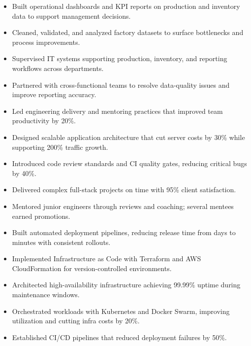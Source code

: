
\begin{itemize}
\item Built operational dashboards and KPI reports on production and inventory data to support management decisions.
\item Cleaned, validated, and analyzed factory datasets to surface bottlenecks and process improvements.
\item Supervised IT systems supporting production, inventory, and reporting workflows across departments.
\item Partnered with cross-functional teams to resolve data-quality issues and improve reporting accuracy.
\end{itemize}
\divider

\begin{itemize}
\item Led engineering delivery and mentoring practices that improved team productivity by 20\%.
\item Designed scalable application architecture that cut server costs by 30\% while supporting 200\% traffic growth.
\item Introduced code review standards and CI quality gates, reducing critical bugs by 40\%.
\item Delivered complex full-stack projects on time with 95\% client satisfaction.
\item Mentored junior engineers through reviews and coaching; several mentees earned promotions.
\end{itemize}
\divider

\begin{itemize}
\item Built automated deployment pipelines, reducing release time from days to minutes with consistent rollouts.
\item Implemented Infrastructure as Code with Terraform and AWS CloudFormation for version-controlled environments.
\item Architected high-availability infrastructure achieving 99.99\% uptime during maintenance windows.
\item Orchestrated workloads with Kubernetes and Docker Swarm, improving utilization and cutting infra costs by 20\%.
\item Established CI/CD pipelines that reduced deployment failures by 50\%.
\end{itemize}
\divider

